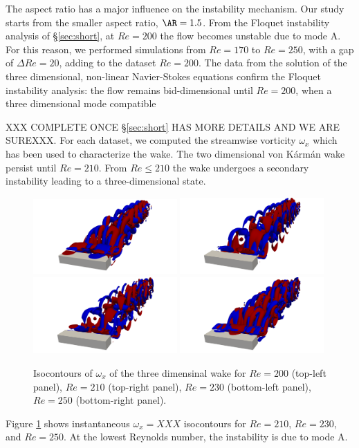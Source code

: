The aspect ratio has a major influence on the instability mechanism. Our study starts from the smaller aspect ratio, $\AR=1.5$. From the Floquet instability analysis of \S \ref{sec:short}, at $Re=200$ the flow becomes unstable due to mode A. For this reason, we performed simulations from $Re=170$ to $Re=250$, with a gap of $\Delta Re=20$, adding to the dataset $Re=200$.
The data from the solution of the three dimensional, non-linear Navier-Stokes equations confirm the Floquet instability analysis: the flow remains bid-dimensional until $Re=200$, when a three dimensional mode compatible 

XXX COMPLETE ONCE \S \ref{sec:short} HAS MORE DETAILS AND WE ARE SUREXXX. For each dataset, we computed the streamwise vorticity $\omega_x$ which has been used to characterize the wake. The two dimensional von Kármán wake persist until $Re=210$. From $Re \leq 210$ the wake undergoes a secondary instability leading to a three-dimensional state.

\begin{figure}
  \centering
  \includegraphics[trim={12cm 0 12cm 0},clip,width=0.49\textwidth]{./fig/Wake/AR1.5Re200.png}     
  \includegraphics[trim={12cm 0 12cm 0},clip,width=0.49\textwidth]{./fig/Wake/AR1.5Re210.png}   
  \includegraphics[trim={12cm 0 12cm 0},clip,width=0.49\textwidth]{./fig/Wake/AR1.5Re230.png} 
  \includegraphics[trim={12cm 0 12cm 0},clip,width=0.49\textwidth]{./fig/Wake/AR1.5Re250.png}
  \caption{Isocontours of $\omega_x$ of the three dimensinal wake for $Re=200$ (top-left panel), $Re=210$ (top-right panel), $Re=230$  (bottom-left panel), $Re=250$ (bottom-right panel).}
  \label{fig:wake1.5}
\end{figure}  

 Figure \ref{fig:wake1.5} shows instantaneous $\omega_x=XXX$ isocontours for $Re=210$, $Re=230$, and $Re=250$. At the lowest Reynolds number, the instability is due to mode A.

